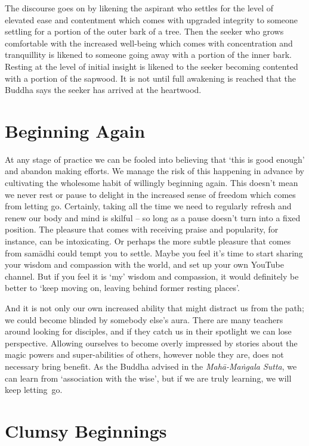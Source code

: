 The discourse goes on by likening the aspirant who settles for the level
of elevated ease and contentment which comes with upgraded integrity to
someone settling for a portion of the outer bark of a tree. Then the
seeker who grows comfortable with the increased well-being which comes
with concentration and tranquillity is likened to someone going away
with a portion of the inner bark. Resting at the level of initial
insight is likened to the seeker becoming contented with a portion of
the sapwood. It is not until full awakening is reached that the Buddha
says the seeker has arrived at the heartwood.

\section{Beginning Again}

At any stage of practice we can be fooled into believing that ‘this is
good enough’ and abandon making efforts. We manage the risk of this
happening in advance by cultivating the wholesome habit of willingly
beginning again. This doesn’t mean we never rest or pause to delight in
the increased sense of freedom which comes from letting go. Certainly,
taking all the time we need to regularly refresh and renew our body and
mind is skilful – so long as a pause doesn’t turn into a fixed position.
The pleasure that comes with receiving praise and popularity, for
instance, can be intoxicating. Or perhaps the more subtle pleasure that
comes from samādhi could tempt you to settle. Maybe you feel it’s time
to start sharing your wisdom and compassion with the world, and set up
your own YouTube channel. But if you feel it is ‘my’ wisdom and
compassion, it would definitely be better to ‘keep moving on, leaving
behind former resting places’.

And it is not only our own increased ability that might distract us from
the path; we could become blinded by somebody else’s aura. There are
many teachers around looking for disciples, and if they catch us in
their spotlight we can lose perspective. Allowing ourselves to become
overly impressed by stories about the magic powers and super-abilities
of others, however noble they are, does not necessary bring benefit. As
the Buddha advised in
the \emph{Mahā-Maṅgala Sutta},\cite{mahamangala-sutta}
we can learn from ‘association with the wise’, but if we are truly learning, we will keep
letting~go.

\section{Clumsy Beginnings}

